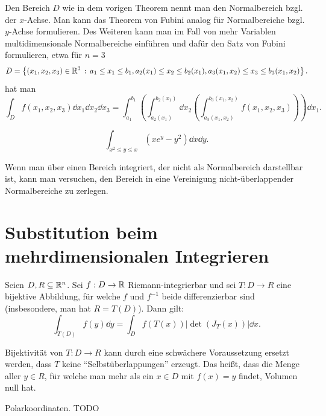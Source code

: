 \begin{bem}
	Den Bereich $D$ wie in dem vorigen Theorem nennt man den Normalbereich bzgl. der $x$-Achse. Man kann das Theorem von Fubini analog für Normalbereiche bzgl. $y$-Achse formulieren. Des Weiteren kann man im Fall von mehr Variablen multidimensionale Normalbereiche einführen und dafür den Satz von Fubini formulieren, etwa für $n=3$
	\[
		D = \left\{ (x_1,x_2,x_3) \in \mathbb{R}^3 \,:\, a_1 \le x_1 \le b_1, a_2(x_1) \le x_2 \le b_2(x_1), a_3(x_1,x_2) \le x_3 \le b_3(x_1,x_2) \right\}. 
	\]
	hat man 
	\[
		\int_D f(x_1,x_2,x_3) \dd x_1 \dd x_2 \dd x_3  = \int_{a_1}^{b_1} \left( \int_{a_2(x_1)}^{b_2(x_1)} \dd x_2 \left( \int_{a_3(x_1,x_2)}^{b_3(x_1,x_2)} f(x_1,x_2,x_3) \right) \right) \dd x_1.
	\]
\end{bem} 

\begin{aufg} 
	\[
		\int_{x^2 \le y \le x} (x e^y - y^2) \dd x \dd y. 
	\]
\end{aufg} 

\begin{bem}
	Wenn man über einen Bereich integriert, der nicht als Normalbereich darstellbar ist, kann man versuchen, den Bereich in eine Vereinigung nicht-überlappender Normalbereiche zu zerlegen. 
\end{bem} 

\section{Substitution beim mehrdimensionalen Integrieren} 

\begin{thm} 
	Seien $D , R \subseteq \mathbb{R}^n$. 
	Sei $f : D \to \mathbb{R}$ Riemann-integrierbar und sei $T : D \to R$ eine bijektive Abbildung, für welche $f$ und $f^{-1}$ beide differenzierbar sind (insbesondere, man hat $R = T(D)$). Dann gilt: 
	\[
		\int_{T(D)} f(y) \dd y = \int_D f(T(x)) | \det( J_T(x))| \dd x. 
	\]
\end{thm} 

\begin{bem} 
	Bijektivität von $T : D \to R$ kann durch eine schwächere Voraussetzung ersetzt werden, dass $T$ keine ``Selbstüberlappungen'' erzeugt. Das heißt, dass die Menge aller $y \in R$, für welche man mehr als ein $x \in D$ mit $f(x) = y$ findet, Volumen null hat. 
\end{bem} 


\begin{bsp} 
	Polarkoordinaten. TODO
\end{bsp} 

